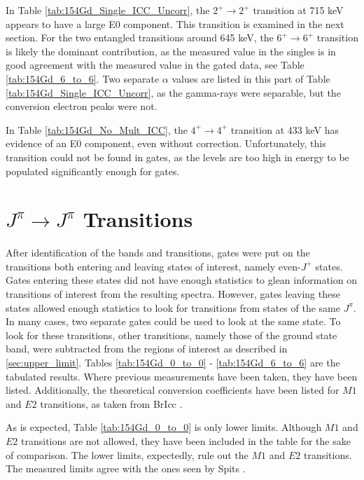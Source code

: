 In Table \ref{tab:154Gd_Single_ICC_Uncorr}, the $2^+\rightarrow2^+$ transition at 715 keV appears to have a large E0 component. This transition is examined in the next section. For the two entangled transitions around 645 keV, the $6^+\rightarrow6^+$ transition is likely the dominant contribution, as the measured value in the singles is in good agreement with the measured value in the gated data, see Table \ref{tab:154Gd_6_to_6}. Two separate $\alpha$ values are listed in this part of Table \ref{tab:154Gd_Single_ICC_Uncorr}, as the gamma-rays were separable, but the conversion electron peaks were not.

In Table \ref{tab:154Gd_No_Mult_ICC}, the $4^+\rightarrow4^+$ transition at 433 keV has evidence of an E0 component, even without correction. Unfortunately, this transition could not be found in gates, as the levels are too high in energy to be populated significantly enough for gates.

\section{$J^{\pi}\rightarrow J^{\pi}$ Transitions}
\label{sec:154_J2J}

After identification of the bands and transitions, gates were put on the transitions both entering and leaving states of interest, namely even-$J^{+}$ states. Gates entering these states did not have enough statistics to glean information on transitions of interest from the resulting spectra. However, gates leaving these states allowed enough statistics to look for transitions from states of the same $J^{\pi}$. In many cases, two separate gates could be used to look at the same state. To look for these transitions, other transitions, namely those of the ground state band, were subtracted from the regions of interest as described in \ref{sec:upper_limit}. Tables \ref{tab:154Gd_0_to_0} - \ref{tab:154Gd_6_to_6} are the tabulated results. Where previous measurements have been taken, they have been listed. Additionally, the theoretical conversion coefficients have been listed for $M1$ and $E2$ transitions, as taken from BrIcc \cite{kibedi08:_BRICC}.

\afterpage{\clearpage}

As is expected, Table \ref{tab:154Gd_0_to_0} is only lower limits. Although $M1$ and $E2$ transitions are not allowed, they have been included in the table for the sake of comparison.  The lower limits, expectedly, rule out the $M1$ and $E2$ transitions. The measured limits agree with the ones seen by Spits \cite{spits96:_154gd}.

